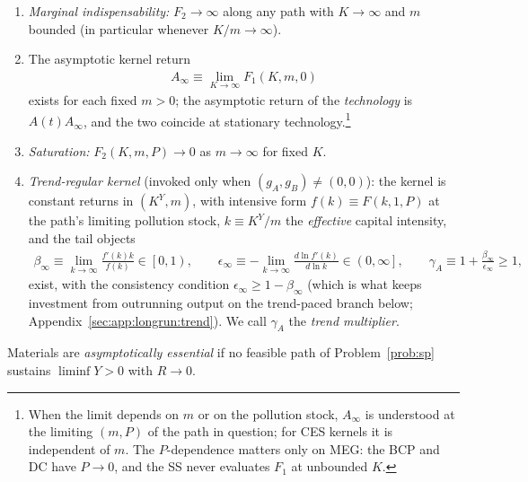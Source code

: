 \begin{assumption}\label{ass:sp:lr:F}
\begin{enumerate}
    \item[(i)] \emph{Marginal indispensability:} $F_2\to\infty$ along any path with $K\to\infty$
    and $m$ bounded (in particular whenever $K/m\to\infty$).
    \item[(ii)] The asymptotic kernel return
    \begin{align}
    A_\infty\equiv\lim_{K\to\infty}F_1\left(K,m,0\right)
    \label{eq:sp:lr:Ainfty}
    \end{align}
    exists for each fixed $m>0$; the asymptotic return of the \emph{technology} is
    $A\left(t\right)A_\infty$, and the two coincide at stationary
    technology.\footnote{When the limit depends on $m$ or on the pollution
    stock, $A_\infty$ is understood at the limiting $\left(m,P\right)$ of the path in
    question; for CES kernels it is independent of $m$. The $P$-dependence matters only
    on MEG: the BCP and DC have $P\to0$, and the SS never evaluates $F_1$ at unbounded $K$.}
    \item[(iii)] \emph{Saturation:} $F_2\left(K,m,P\right)\to0$ as $m\to\infty$ for fixed $K$.
    \item[(iv)] \emph{Trend-regular kernel} (invoked only when
    $\left(g_A,g_B\right)\ne\left(0,0\right)$): the kernel is constant returns in
    $\left(K^Y,m\right)$, with intensive form $f\left(k\right)\equiv F\left(k,1,P\right)$ at
    the path's limiting pollution stock, $k\equiv K^Y/m$ the \emph{effective} capital
    intensity, and the tail objects
    \begin{align}
    \beta_\infty\equiv\lim_{k\to\infty}\frac{f'\left(k\right)k}{f\left(k\right)}\in\left[0,1\right),
    \qquad
    \epsilon_\infty\equiv-\lim_{k\to\infty}\frac{d\ln f'\left(k\right)}{d\ln k}\in\left(0,\infty\right],
    \qquad
    \gamma_A\equiv1+\frac{\beta_\infty}{\epsilon_\infty}\ge1,
    \label{eq:sp:lr:kernel-tails}
    \end{align}
    exist, with the consistency condition $\epsilon_\infty\ge1-\beta_\infty$ (which is what
    keeps investment from outrunning output on the trend-paced branch below;
    Appendix~\ref{sec:app:longrun:trend}). We call $\gamma_A$ the \emph{trend multiplier}.
\end{enumerate}
\end{assumption}

\begin{definition}\label{def:sp:lr:essential}
Materials are \emph{asymptotically essential} if no feasible path of Problem~\ref{prob:sp}
sustains $\liminf Y>0$ with $R\to0$.
\end{definition}

